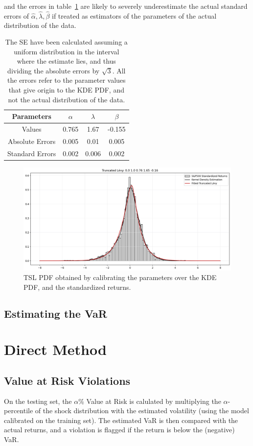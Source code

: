 \documentclass[11pt]{article}
\begin{document}
        and the errors in table~\ref{tab:parameters} are likely to severely underestimate the actual standard errors of $\hat{\alpha}, \hat{\lambda}, \hat{\beta}$ if treated as estimators of the parameters of the actual distribution of the data.

        \begin{table}[h!]
            \centering
            \begin{tabular}{c|c|c|c}
                \hline
                Parameters & $\alpha$ & $\lambda$ & $\beta$  \\
                \hline
                 Values & 0.765 & 1.67 & -0.155\\
                Absolute Errors & 0.005 & 0.01 & 0.005 \\
                Standard Errors & 0.002 & 0.006 & 0.002 \\
                \hline
            \end{tabular}
            \caption{The SE have been calculated assuming a uniform distribution in the interval where the estimate lies, and thus dividing the absolute errors by $\sqrt{3}$.
            All the errors refer to the parameter values that give origin to the KDE PDF, and not the actual distribution of the data.}
            \label{tab:parameters}
        \end{table}

        \begin{figure}[h!]
            \centering
            \includegraphics[width=0.6 \linewidth]{fitted_tls}
            \caption{TSL PDF obtained by calibrating the parameters over the KDE PDF, and the standardized returns.}
            \label{fig:fitted_tls}
        \end{figure}

        \subsection{Estimating the VaR}



    \section{Direct Method} \label{sec:direct}
    \subsection{Value at Risk Violations}
        On the testing set, the $\alpha$\% Value at Risk is calulated by multiplying the $\alpha$-percentile of the shock distribution with the estimated volatility (using the model calibrated on the training set).
        The estimated VaR is then compared with the actual returns, and a violation is flagged if the return is below the (negative) VaR.
\end{document}
